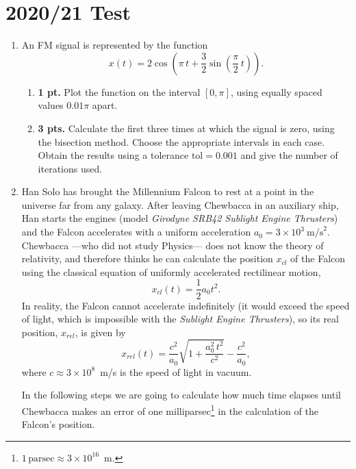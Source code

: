 \section{2020/21 Test}
\begin{enumerate}
\item An FM signal is represented by the function
\begin{equation*}
	x(t) = 2\cos\left(\pi \, t+ \frac{3}{2}\sin\left(\frac{\pi}{2} \, t\right)\right).
\end{equation*}
\begin{enumerate}
	\item \textbf{1 pt.} Plot the function on the interval $[0,\pi]$, using equally spaced values $0.01\pi$ apart.

    \item \textbf{3 pts.} Calculate the first three times at which the signal is zero, using the bisection method. Choose the appropriate intervals in each case. Obtain the results using a tolerance $\text{tol}=0.001$ and give the number of iterations used.
\end{enumerate}

\item Han Solo has brought the Millennium Falcon to rest at a point in the universe far from any galaxy. After leaving Chewbacca in an auxiliary ship, Han starts the engines (model \emph{Girodyne SRB42 Sublight Engine Thrusters}) and the Falcon accelerates with a uniform acceleration $a_0 = 3\times10^3\ \text{m/s}^2$. Chewbacca ---who did not study Physics--- does not know the theory of relativity, and therefore thinks he can calculate the position $x_{cl}$ of the Falcon using the classical equation of uniformly accelerated rectilinear motion,
\begin{equation*}
	x_{cl}(t) =\frac{1}{2}a_0t^2.
\end{equation*}
		In reality, the Falcon cannot accelerate indefinitely (it would exceed the speed of light, which is impossible with the \emph{Sublight Engine Thrusters}), so its real position, $x_{rel}$, is given by
\begin{equation*}
	x_{rel}(t) = \frac{c^2}{a_0}\sqrt{1 + \frac{a_0^2\,t^2}{c^2}} -\frac{c^2}{a_0},
\end{equation*}
		where $c \approx 3\times 10^8$~m/s is the speed of light in vacuum.

		In the following steps we are going to calculate how much time elapses until Chewbacca makes an error of one milliparsec\footnote{$1\,\text{parsec} \approx 3\times 10^{16}$~m.} in the calculation of the Falcon's position.


\end{enumerate}
